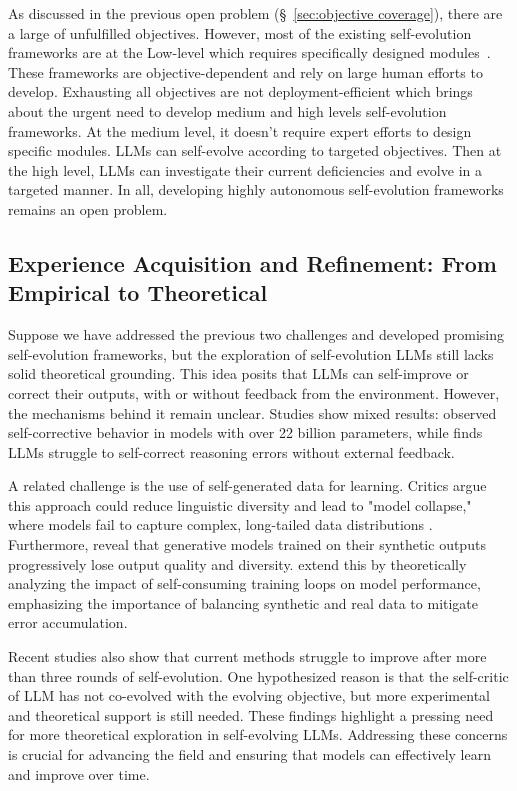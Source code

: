 \documentclass[sn-basic, Numbered]{sn-jnl}%
\theoremstyle{thmstyleone}%
\theoremstyle{thmstyletwo}%
\theoremstyle{thmstylethree}%
\begin{document}
As discussed in the previous open problem (\S~\ref{sec:objective coverage}), there are a large of unfulfilled objectives. 
However, most of the existing self-evolution frameworks are at the Low-level which requires specifically designed modules~\cite{yuan2024self, lu2024large, qiao2024autoact}. These frameworks are objective-dependent and rely on large human efforts to develop. 
Exhausting all objectives are not deployment-efficient which brings about the urgent need to develop medium and high levels self-evolution frameworks.
At the medium level, it doesn't require expert efforts to design specific modules. LLMs can self-evolve according to targeted objectives.
Then at the high level, LLMs can investigate their current deficiencies and evolve in a targeted manner.
In all, developing highly autonomous self-evolution frameworks remains an open problem.


\subsection{Experience Acquisition and Refinement: From Empirical to Theoretical} 
Suppose we have addressed the previous two challenges and developed promising self-evolution frameworks, but the exploration of self-evolution LLMs still lacks solid theoretical grounding. This idea posits that LLMs can self-improve or correct their outputs, with or without feedback from the environment. However, the mechanisms behind it remain unclear. Studies show mixed results: \citet{huang2023large} observed self-corrective behavior in models with over 22 billion parameters, while \citet{ganguli2023capacity} finds LLMs struggle to self-correct reasoning errors without external feedback.

A related challenge is the use of self-generated data for learning. Critics argue this approach could reduce linguistic diversity \cite{guo2023curious} and lead to "model collapse," where models fail to capture complex, long-tailed data distributions \cite{shumailov2023curse}. Furthermore, \citet{alemohammad2023self} reveal that generative models trained on their synthetic outputs progressively lose output quality and diversity. \citet{fu2024towards} extend this by theoretically analyzing the impact of self-consuming training loops on model performance, emphasizing the importance of balancing synthetic and real data to mitigate error accumulation. 

Recent studies \cite{yang2024react, singh2023beyond} also show that current methods struggle to improve after more than three rounds of self-evolution. One hypothesized reason is that the self-critic of LLM has not co-evolved with the evolving objective, but more experimental and theoretical support is still needed. These findings highlight a pressing need for more theoretical exploration in self-evolving LLMs. Addressing these concerns is crucial for advancing the field and ensuring that models can effectively learn and improve over time.
\end{document}
